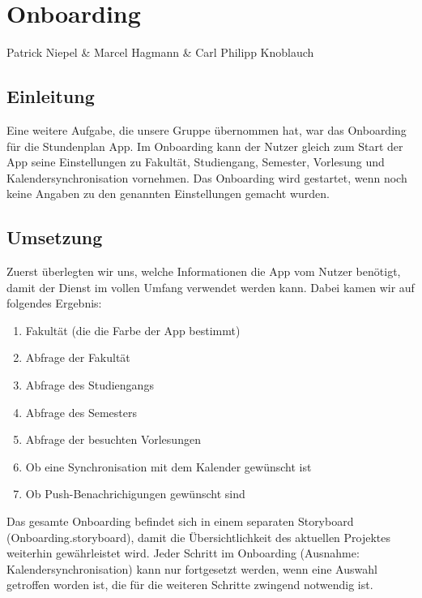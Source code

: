 \chapter{Onboarding}
Patrick Niepel \& Marcel Hagmann \& Carl Philipp Knoblauch

\section{Einleitung}
Eine weitere Aufgabe, die unsere Gruppe übernommen hat, war das Onboarding für die Stundenplan App. Im Onboarding kann der Nutzer gleich zum Start der App seine Einstellungen zu Fakultät, Studiengang, Semester, Vorlesung und Kalendersynchronisation vornehmen. Das Onboarding wird gestartet, wenn noch keine Angaben zu den genannten Einstellungen gemacht wurden.


\section{Umsetzung}
Zuerst überlegten wir uns, welche Informationen die App vom Nutzer benötigt, damit der Dienst im vollen Umfang verwendet werden kann.
Dabei kamen wir auf folgendes Ergebnis:
\begin{enumerate}
\item Fakultät (die die Farbe der App bestimmt)
\item Abfrage der Fakultät
\item Abfrage des Studiengangs
\item Abfrage des Semesters
\item  Abfrage der besuchten Vorlesungen
\item Ob eine Synchronisation mit dem Kalender gewünscht ist
\item Ob Push-Benachrichigungen gewünscht sind
\end{enumerate}

Das gesamte Onboarding befindet sich in einem separaten Storyboard (Onboarding.storyboard), damit die Übersichtlichkeit des aktuellen Projektes weiterhin gewährleistet wird.
Jeder Schritt im Onboarding (Ausnahme: Kalendersynchronisation) kann nur fortgesetzt werden, wenn eine Auswahl getroffen worden ist, die für die weiteren Schritte zwingend notwendig ist.